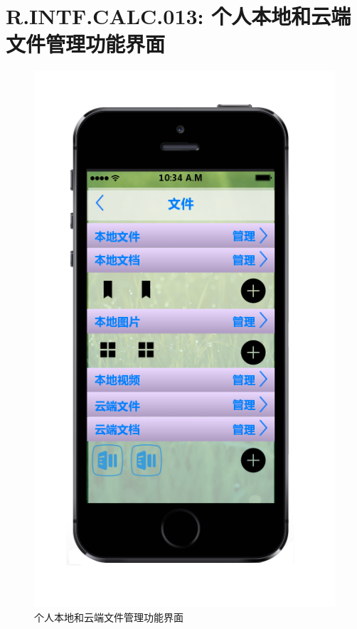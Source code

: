     \section{R.INTF.CALC.013: 个人本地和云端文件管理功能界面}
    \begin{figure}[h]
        \centering
        \includegraphics[scale=0.6]{OutlineDesign/figures/个人本地和云端文件管理功能界面.png}
        \caption{个人本地和云端文件管理功能界面}
        \label{fig:server_flow}
    \end{figure}
    \newpage
